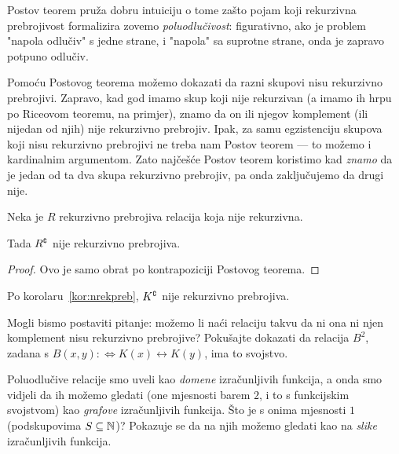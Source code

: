 Postov teorem pruža dobru intuiciju o tome zašto pojam koji rekurzivna prebrojivost formalizira zovemo \emph{poluodlučivost}: figurativno, ako je problem "napola odlučiv" s jedne strane, i "napola" sa suprotne strane, onda je zapravo potpuno odlučiv.

Pomoću Postovog teorema možemo dokazati da razni skupovi nisu rekurzivno prebrojivi. Zapravo, kad god imamo skup koji nije rekurzivan (a imamo ih hrpu po Riceovom teoremu, na primjer), znamo da on ili njegov komplement (ili nijedan od njih) nije rekurzivno prebrojiv.
Ipak, za samu egzistenciju skupova koji nisu rekurzivno prebrojivi ne treba nam Postov teorem --- to možemo i kardinalnim argumentom.
Zato najčešće Postov teorem koristimo kad \emph{znamo} da je jedan od ta dva skupa rekurzivno prebrojiv, pa onda zaključujemo da drugi nije.

\begin{korolar}[{name=[kriterij za negaciju rekurzivne prebrojivosti]}]\label{kor:nrekpreb}
Neka je $R$ rekurzivno prebrojiva relacija koja nije rekurzivna.

    Tada $R\sp{{\scriptscriptstyle\complement}}$ nije rekurzivno prebrojiva.
\end{korolar}
\begin{proof}
Ovo je samo obrat po kontrapoziciji Postovog teorema.
\end{proof}

\begin{primjer}[{name=[komplement Kleenejevog skupa nije rekurzivno prebrojiv]}]
    Po korolaru~\ref{kor:nrekpreb}, $K\sp{{\scriptscriptstyle\complement}}$ nije rekurzivno prebrojiva.
\end{primjer}

Mogli bismo postaviti pitanje: možemo li naći relaciju takvu da ni ona ni njen komplement nisu rekurzivno prebrojive? Pokušajte dokazati da relacija $B^2$, zadana s $B(x,y):\Longleftrightarrow K(x)\leftrightarrow K(y)$, ima to svojstvo.


Poluodlučive relacije smo uveli kao \emph{domene} izračunljivih funkcija, a onda smo vidjeli da ih možemo gledati (one mjesnosti barem $2$, i to s funkcijskim svojstvom) kao \emph{grafove} izračunljivih funkcija. Što je s onima mjesnosti $1$ (podskupovima $S\subseteq{\mathbb N}$)? Pokazuje se da na njih možemo gledati kao na \emph{slike} izračunljivih funkcija.

